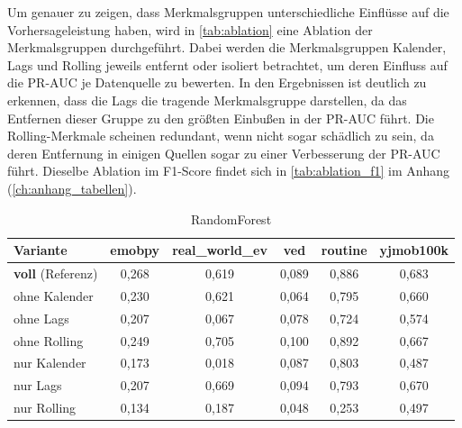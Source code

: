 Um genauer zu zeigen, dass Merkmalsgruppen unterschiedliche Einflüsse auf die Vorhersageleistung haben, wird in \cref{tab:ablation} eine Ablation der Merkmalsgruppen durchgeführt. Dabei werden die Merkmalsgruppen Kalender, Lags und Rolling jeweils entfernt oder isoliert betrachtet, um deren Einfluss auf die PR-AUC je Datenquelle zu bewerten. In den Ergebnissen ist deutlich zu erkennen, dass die Lags die tragende Merkmalsgruppe darstellen, da das Entfernen dieser Gruppe zu den größten Einbußen in der PR-AUC führt. Die Rolling-Merkmale scheinen redundant, wenn nicht sogar schädlich zu sein, da deren Entfernung in einigen Quellen sogar zu einer Verbesserung der PR-AUC führt. Dieselbe Ablation im F1-Score findet sich in \cref{tab:ablation_f1} im Anhang (\cref{ch:anhang_tabellen}).

\begin{table}[H]
    \centering
    \caption{Ablation der Merkmalsgruppen: PR-AUC je Datenquelle, zeitlich in-distribution. Verworfene Zeilen richten sich in allen Varianten nach dem vollständigen Merkmalssatz, sodass je Quelle identische Beobachtungen zugrunde liegen. Die Referenzzeile weicht geringfügig von \cref{tab:cv_metrics} ab, da die Ablation als Einzellauf auf einer etwas kleineren Zeilenbasis rechnet.}
    \label{tab:ablation}

    \begin{subtable}{\textwidth}
        \centering
        \caption{RandomForest}
        \label{tab:ablation_rf}
        \begin{tabular}{lccccc}
            \toprule
            \textbf{Variante} & emobpy & real\_world\_ev & ved & routine & yjmob100k \\
            \midrule
            \textbf{voll} (Referenz)     & 0,268 & 0,619 & 0,089 & 0,886 & 0,683 \\
            \addlinespace
            ohne Kalender                & 0,230 & 0,621 & 0,064 & 0,795 & 0,660 \\
            ohne Lags                    & 0,207 & 0,067 & 0,078 & 0,724 & 0,574 \\
            ohne Rolling                 & 0,249 & 0,705 & 0,100 & 0,892 & 0,667 \\
            \addlinespace
            nur Kalender                 & 0,173 & 0,018 & 0,087 & 0,803 & 0,487 \\
            nur Lags                     & 0,207 & 0,669 & 0,094 & 0,793 & 0,670 \\
            nur Rolling                  & 0,134 & 0,187 & 0,048 & 0,253 & 0,497 \\
            \bottomrule
        \end{tabular}
    \end{subtable}


\end{table}
